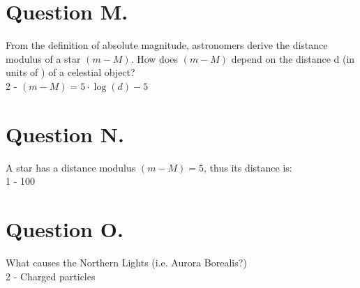 \documentclass[11pt,a4paper,twoside]{article}
\begin{document}
\section*{Question M.}

From the definition of absolute magnitude, astronomers derive the distance modulus of a star $\left( m - M \right)$. How does $\left( m - M \right)$ depend on the distance d (in units of \si{\parsec}) of a celestial object? \\

2 - $\left( m - M \right) = 5 \cdot \log{\left( d \right)} - 5$

\section*{Question N.}

A star has a distance modulus $\left( m - M \right) = \num{5}$, thus its distance is: \\

1 - \SI{100}{\parsec}

\section*{Question O.}

What causes the Northern Lights (i.e. Aurora Borealis?) \\

2 - Charged particles
\end{document}
